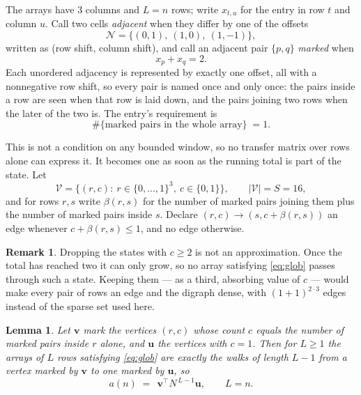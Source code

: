 \documentclass[11pt,a4paper]{article}
\theoremstyle{plain}
\newtheorem{lemma}[theorem]{Lemma}
\theoremstyle{definition}
\newtheorem{remark}[theorem]{Remark}
\begin{document}
The arrays have $3$ columns and $L=n$ rows; write $x_{t,u}$ for the entry in
row $t$ and column $u$. Call two cells \emph{adjacent} when they differ by one of the
offsets
\[
\mathcal N=\{(0,1),\ (1,0),\ (1,-1)\},
\]
written as (row shift, column shift), and call an adjacent pair $\{p,q\}$
\emph{marked} when
\[
x_{p}+x_{q}=2 .
\]
Each unordered adjacency is represented by exactly one offset, all with a nonnegative row
shift, so every pair is named once and only once: the pairs inside a row are seen when
that row is laid down, and the pairs joining two rows when the later of the two is. The
entry's requirement is
\begin{equation}\label{eq:glob}
\#\{\text{marked pairs in the whole array}\}\;=1.
\end{equation}

This is not a condition on any bounded window, so no transfer matrix over rows alone can
express it. It becomes one as soon as the running total is part of the state. Let
\[
\mathcal V=\bigl\{(r,c):\ r\in\{0,\dots,1\}^{3},\ c\in\{0,1\}\bigr\},
\qquad |\mathcal V|=S=16,
\]
and for rows $r,s$ write $\beta(r,s)$ for the number of marked pairs joining them plus the
number of marked pairs inside $s$. Declare $(r,c)\to(s,c+\beta(r,s))$ an edge whenever
$c+\beta(r,s)\le1$, and no edge otherwise.

\begin{remark}
Dropping the states with $c\ge2$ is not an approximation. Once the total has reached two it
can only grow, so no array satisfying \eqref{eq:glob} passes through such a state. Keeping
them --- as a third, absorbing value of $c$ --- would make every pair of rows an edge and
the digraph dense, with $(1+1)^{2\cdot3}$ edges instead of the sparse set used here.
\end{remark}

\begin{lemma}\label{lem:walk}
Let $\mathbf{v}$ mark the vertices $(r,c)$ whose count $c$ equals the number of marked pairs
inside $r$ alone, and $\mathbf{u}$ the vertices with $c=1$. Then for $L\ge1$ the arrays
of $L$ rows satisfying \eqref{eq:glob} are exactly the walks of length $L-1$ from a
vertex marked by $\mathbf{v}$ to one marked by $\mathbf{u}$, so
\[
a(n)\;=\;\,\mathbf{v}^{\!\top}N^{\,L-1}\mathbf{u},\qquad L=n .
\]
\end{lemma}
\end{document}
